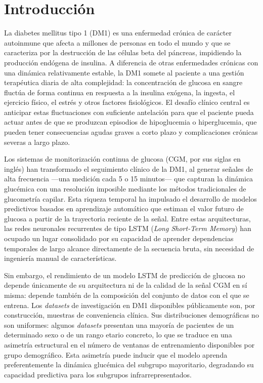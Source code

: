 \chapter{Introducción}
\label{chapter:introduccion}


La diabetes mellitus tipo 1 (DM1) es una enfermedad crónica de carácter autoinmune que afecta a millones de personas en todo el mundo y que se caracteriza por la destrucción de las células beta del páncreas, impidiendo la producción endógena de insulina. A diferencia de otras enfermedades crónicas con una dinámica relativamente estable, la DM1 somete al paciente a una gestión terapéutica diaria de alta complejidad: la concentración de glucosa en sangre fluctúa de forma continua en respuesta a la insulina exógena, la ingesta, el ejercicio físico, el estrés y otros factores fisiológicos. El desafío clínico central es anticipar estas fluctuaciones con suficiente antelación para que el paciente pueda actuar antes de que se produzcan episodios de hipoglucemia o hiperglucemia, que pueden tener consecuencias agudas graves a corto plazo y complicaciones crónicas severas a largo plazo.

Los sistemas de monitorización continua de glucosa (CGM, por sus siglas en inglés) han transformado el seguimiento clínico de la DM1, al generar señales de alta frecuencia —una medición cada 5 o 15 minutos— que capturan la dinámica glucémica con una resolución imposible mediante los métodos tradicionales de glucometría capilar. Esta riqueza temporal ha impulsado el desarrollo de modelos predictivos basados en aprendizaje automático que estiman el valor futuro de glucosa a partir de la trayectoria reciente de la señal. Entre estas arquitecturas, las redes neuronales recurrentes de tipo LSTM (\emph{Long Short-Term Memory}) han ocupado un lugar consolidado por su capacidad de aprender dependencias temporales de largo alcance directamente de la secuencia bruta, sin necesidad de ingeniería manual de características.

Sin embargo, el rendimiento de un modelo LSTM de predicción de glucosa no depende únicamente de su arquitectura ni de la calidad de la señal CGM en sí misma: depende también de la composición del conjunto de datos con el que se entrena. Los \emph{datasets} de investigación en DM1 disponibles públicamente son, por construcción, muestras de conveniencia clínica. Sus distribuciones demográficas no son uniformes: algunos \emph{datasets} presentan una mayoría de pacientes de un determinado sexo o de un rango etario concreto, lo que se traduce en una asimetría estructural en el número de ventanas de entrenamiento disponibles por grupo demográfico. Esta asimetría puede inducir que el modelo aprenda preferentemente la dinámica glucémica del subgrupo mayoritario, degradando su capacidad predictiva para los subgrupos infrarrepresentados.

